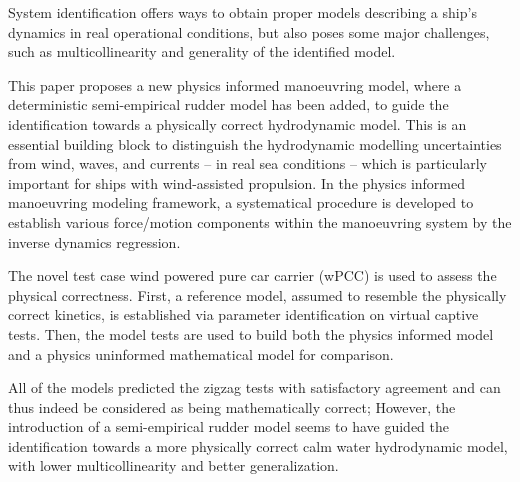 System identification offers ways to obtain proper models describing a ship's dynamics in real operational conditions, but also poses some major challenges, such as multicollinearity and generality of the identified model. 

This paper proposes a new physics informed manoeuvring model, where a deterministic semi-empirical rudder model has been added, to guide the identification towards a physically correct hydrodynamic model.  
This is an essential building block to distinguish the hydrodynamic modelling uncertainties from wind, waves, and currents -- in real sea conditions -- which is particularly important for ships with wind-assisted propulsion.
In the physics informed manoeuvring modeling framework, a systematical procedure is developed to establish various force/motion components within the manoeuvring system by the inverse dynamics regression. 

The novel test case wind powered pure car carrier (wPCC) is used to assess the physical correctness. First, a reference model, assumed to resemble the physically correct kinetics, is established via parameter identification on virtual captive tests. Then, the model tests are used to build both the physics informed model and a physics uninformed mathematical model for comparison.

All of the models predicted the zigzag tests with satisfactory agreement and can thus indeed be considered as being mathematically correct; However, the introduction of a semi-empirical rudder model seems to have guided the identification towards a more physically correct calm water hydrodynamic model, with lower multicollinearity and better generalization.

